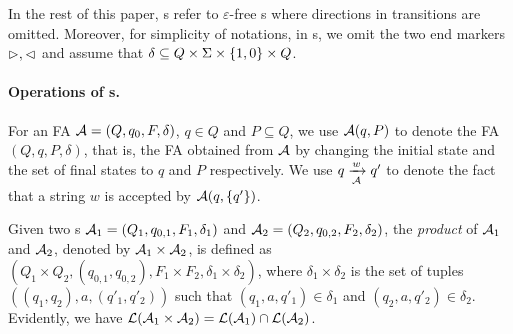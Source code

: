 In the rest of this paper, \FA{}s refer to $\varepsilon$-free \FA{}s where directions in transitions are omitted. Moreover, for simplicity of notations, in \FA{}s, we omit the two end markers $\vartriangleright, \vartriangleleft$ and assume that $\delta \subseteq Q \times \Sigma \times    \{1,0\} \times Q$. 

\paragraph{Operations of \FA{}s.} For an FA $\mathcal{A}=(Q, q_0, F, \delta)$, $q \in Q$ and $P \subseteq Q$, we use $\mathcal{A}(q, P)$ to denote the FA $(Q, q, P, \delta)$, that is, the FA obtained from $\mathcal{A}$ by changing the initial state and the set of final states to $q$ and $P$ respectively. We use $q \xrightarrow[\mathcal{A}]{w} q'$ to denote the fact that a string $w$ is accepted by $\mathcal{A}(q, \{q'\})$. 


Given two \FA{}s $\mathcal{A}_1 = (Q_1, q_{0,1}, F_{1}, \delta_1)$ and $\mathcal{A}_2 = (Q_2, q_{0,2}, F_2, \delta_2)$, the \emph{product} of $\mathcal{A}_1$ and $\mathcal{A}_2$, denoted by $\mathcal{A}_1 \times \mathcal{A}_2$, is defined as $(Q_1 \times Q_2, (q_{0,1}, q_{0,2}), F_1 \times F_2, \delta_1 \times \delta_2)$, where $\delta_1 \times \delta_2$ is the set of tuples $((q_1,q_2), a, (q'_1, q'_2))$ such that $(q_1, a, q'_1) \in \delta_1$ and $(q_2, a, q'_2) \in \delta_2$. Evidently, we have $\mathcal{L}(\mathcal{A}_1 \times \mathcal{A}_2) = \mathcal{L}(\mathcal{A}_1) \cap \mathcal{L}(\mathcal{A}_2)$.


%
%
%


